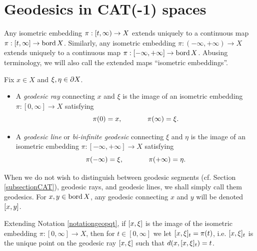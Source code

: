 \bigskip
\section{Geodesics in CAT(-1) spaces} \label{subsectiongeodesicsCAT}

\begin{observation}
Any isometric embedding $\pi:[t,\infty)\to X$ extends uniquely to a continuous map $\pi:[t,\infty]\to \operatorname{bord} X$. Similarly, any isometric embedding $\pi:(-\infty,+\infty)\to X$ extends uniquely to a continuous map $\pi:[-\infty,+\infty]\to \operatorname{bord} X$. Abusing terminology, we will also call the extended maps ``isometric embeddings''.
\end{observation}



\begin{definition}
\label{definitiongeodesic}
Fix $x\in X$ and $\xi,\eta\in\partial X$.
\begin{itemize}
\item A \emph{geodesic ray} connecting $x$ and $\xi$ is the image of an isometric embedding $\pi:[0,\infty]\to X$ satisfying
\[
\pi(0) = x,\hspace{.5 in}\pi(\infty) = \xi.
\]
\item A \emph{geodesic line} or \emph{bi-infinite geodesic} connecting $\xi$ and $\eta$ is the image of an isometric embedding $\pi:[-\infty,+\infty]\to X$ satisfying
\[
\pi(-\infty) = \xi,\hspace{.5 in}\pi(+\infty) = \eta.
\]
\end{itemize}
When we do not wish to distinguish between geodesic segments (cf. Section \ref{subsectionCAT}), geodesic rays, and geodesic lines, we shall simply call them geodesics. For $x,y\in\operatorname{bord} X$, any geodesic connecting $x$ and $y$ will be denoted $[x,y]$.
\end{definition}

\begin{notation}
\label{notationgeopqt2}
Extending Notation \ref{notationgeopqt}, if $[x,\xi]$ is the image of the isometric embedding $\pi:[0,\infty]\to X$, then for $t\in[0,\infty]$ we let $[x,\xi]_t = \pi(t)$, i.e. $[x,\xi]_t$ is the unique point on the geodesic ray $[x,\xi]$ such that $d(x,[x,\xi]_t) = t$.
\end{notation}


